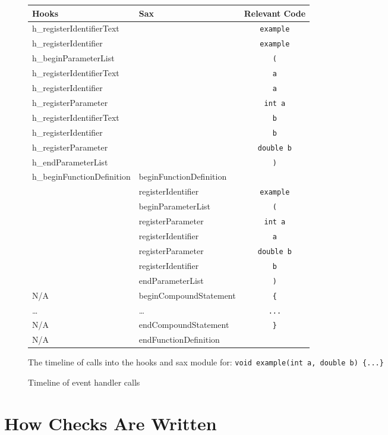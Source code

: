 \documentclass[12pt]{report}
\begin{document}
\begin{figure}
\caption{Timeline of event handler calls}
\label{handlerTimeline}
\begin{center}
\begin{tabular}{llc}
\toprule
Hooks & Sax  & Relevant Code\\
\midrule
h\_registerIdentifierText & & \lstinline!example! \\
h\_registerIdentifier & & \lstinline!example! \\
h\_beginParameterList & & \lstinline!(! \\
h\_registerIdentifierText & & \lstinline!a! \\
h\_registerIdentifier & & \lstinline!a! \\
h\_registerParameter & & \lstinline!int a! \\
h\_registerIdentifierText & & \lstinline!b! \\
h\_registerIdentifier & & \lstinline!b! \\
h\_registerParameter & & \lstinline!double b! \\
h\_endParameterList & & \lstinline!)! \\
h\_beginFunctionDefinition & beginFunctionDefinition & \\
 & registerIdentifier & \lstinline!example! \\
 & beginParameterList & \lstinline!(! \\
 & registerParameter & \lstinline!int a! \\
 & registerIdentifier & \lstinline!a! \\
 & registerParameter & \lstinline!double b!\\
 & registerIdentifier & \lstinline!b!\\
 & endParameterList & \lstinline!)!\\
N/A & beginCompoundStatement & \lstinline!{!\\
\ldots & \ldots & \lstinline!...! \\
N/A & endCompoundStatement & \lstinline!}!\\
N/A & endFunctionDefinition \\
 \bottomrule
\end{tabular}
\end{center}
\small{The timeline of calls into the hooks and sax module for:
 \lstinline!void example(int a, double b) {...}!
}
\end{figure}
\newpage

\section{How Checks Are Written}
\end{document}
